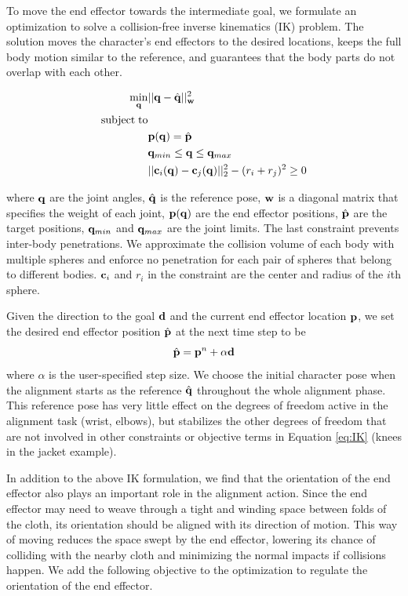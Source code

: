 To move the end effector towards the intermediate goal, we formulate an optimization to solve a collision-free inverse kinematics (IK) problem. The solution moves the character's end effectors to the desired locations, keeps the full body motion similar to the reference, and guarantees that the body parts do not overlap with each other.

\begin{align}
\label{eq:IK}
  \min_{\mathbf{q}} & ||\mathbf{q} - \hat{\mathbf{q}}||_{\mathbf{w}}^2 \\
  \nonumber  \mathrm{subject\;} \mathrm{to} & \\
  \nonumber  &\mathbf{p}(\mathbf{q}) = \hat{\mathbf{p}}\\
  \nonumber   &\mathbf{q}_{min} \leq \mathbf{q} \leq \mathbf{q}_{max}\\
  \nonumber   &||\mathbf{c}_i(\mathbf{q}) - \mathbf{c}_j(\mathbf{q})||_2^2 - (r_i + r_j)^2 \geq 0
\end{align}

where $\mathbf{q}$ are the joint angles, $\hat{\mathbf{q}}$ is the reference pose, $\mathbf{w}$ is a diagonal matrix that specifies the weight of each joint, $\mathbf{p}(\mathbf{q})$ are the end effector positions, $\hat{\mathbf{p}}$ are the target positions, $\mathbf{q}_{min}$ and $\mathbf{q}_{max}$ are the joint limits. The last constraint prevents inter-body penetrations. We approximate the collision volume of each body with multiple spheres and enforce no penetration for each pair of spheres that belong to different bodies. $\mathbf{c}_i$ and $r_i$ in the constraint are the center and radius of the $i$th sphere.

Given the direction to the goal $\mathbf{d}$ and the current end effector location $\mathbf{p}$, we set the desired end effector position $\hat{\mathbf{p}}$ at the next time step to be
\begin{equation}
  \hat{\mathbf{p}} = \mathbf{p}^n+\alpha\mathbf{d}
  \label{eq:target}
\end{equation}
where $\alpha$ is the user-specified step size. We choose the initial character pose when the alignment starts as the reference $\hat{\mathbf{q}}$ throughout the whole alignment phase. This reference pose has very little effect on the degrees of freedom active in the alignment task (\eg wrist, elbows), but stabilizes the other degrees of freedom that are not involved in other constraints or objective terms in Equation \ref{eq:IK} (\eg knees in the jacket example).

In addition to the above IK formulation, we find that the orientation of the end effector also plays an important role in the alignment action. Since the end effector may need to weave through a tight and winding space between folds of the cloth, its orientation should be aligned with its direction of motion. This way of moving reduces the space swept by the end effector, lowering its chance of colliding with the nearby cloth and minimizing the normal impacts if collisions happen. We add the following objective to the optimization to regulate the orientation of the end effector.

